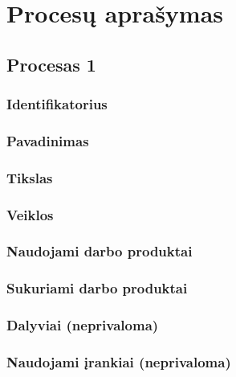 \section{Procesų aprašymas}

\subsection{Procesas 1}

\subsubsection{Identifikatorius}
\subsubsection{Pavadinimas}
\subsubsection{Tikslas}
\subsubsection{Veiklos}

\subsubsection{Naudojami darbo produktai}
\subsubsection{Sukuriami darbo produktai}
\subsubsection{Dalyviai (neprivaloma)}
\subsubsection{Naudojami įrankiai (neprivaloma)}